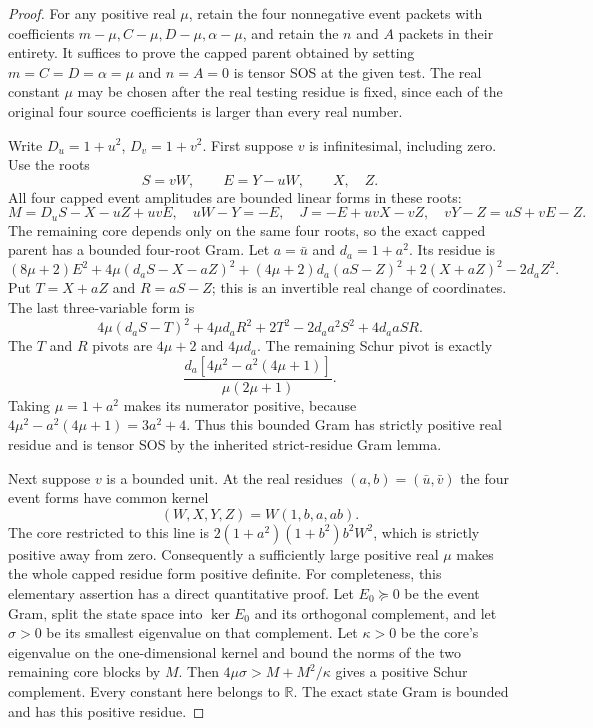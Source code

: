 \begin{proof}
For any positive real $\mu$, retain the four nonnegative event
packets with coefficients $m-\mu,C-\mu,D-\mu,\alpha-\mu$, and
retain the $n$ and $A$ packets in their entirety. It suffices to
prove the capped parent obtained by setting
$m=C=D=\alpha=\mu$ and $n=A=0$ is tensor SOS at the given test.
The real constant $\mu$ may be chosen after the real testing
residue is fixed, since each of the original four source
coefficients is larger than every real number.

Write $D_u=1+u^2$, $D_v=1+v^2$.
First suppose $v$ is infinitesimal, including zero. Use the roots
\[
 S=vW,\qquad E=Y-uW,\qquad X,\quad Z.
\]
All four capped event amplitudes are bounded linear forms in
these roots:
\[
 M=D_uS-X-uZ+uvE,\quad uW-Y=-E,\quad
 J=-E+uvX-vZ,\quad vY-Z=uS+vE-Z.
\]
The remaining core depends only on the same four roots, so the
exact capped parent has a bounded four-root Gram.
Let $a=\bar u$ and $d_a=1+a^2$. Its residue is
\[
 (8\mu+2)E^2+
 4\mu(d_aS-X-aZ)^2+(4\mu+2)d_a(aS-Z)^2
       +2(X+aZ)^2-2d_aZ^2.
\]
Put $T=X+aZ$ and $R=aS-Z$; this is an invertible real change of
coordinates. The last three-variable form is
\[
 4\mu(d_aS-T)^2+4\mu d_aR^2+2T^2
       -2d_a a^2S^2+4d_a aSR.
\]
The $T$ and $R$ pivots are $4\mu+2$ and $4\mu d_a$.
The remaining Schur pivot is exactly
\[
 \frac{d_a[4\mu^2-a^2(4\mu+1)]}{\mu(2\mu+1)}.
\]
Taking $\mu=1+a^2$ makes its numerator positive, because
$4\mu^2-a^2(4\mu+1)=3a^2+4$.
Thus this bounded Gram has strictly positive real residue and
is tensor SOS by the inherited strict-residue Gram lemma.

Next suppose $v$ is a bounded unit. At the real residues
$(a,b)=(\bar u,\bar v)$ the four event forms have common kernel
\[
 (W,X,Y,Z)=W(1,b,a,ab).
\]
The core restricted to this line is
$2(1+a^2)(1+b^2)b^2W^2$, which is strictly positive away from zero.
Consequently a sufficiently large positive real $\mu$ makes the
whole capped residue form positive definite. For completeness,
this elementary assertion has a direct quantitative proof.
Let $E_0\succeq0$ be the event Gram, split the state space into
$\ker E_0$ and its orthogonal complement, and let $\sigma>0$ be
its smallest eigenvalue on that complement. Let $\kappa>0$ be
the core's eigenvalue on the one-dimensional kernel and bound
the norms of the two remaining core blocks by $M$.
Then $4\mu\sigma>M+M^2/\kappa$ gives a positive Schur
complement. Every constant here belongs to $\mathbb R$.
The exact state Gram is bounded and has this positive residue.


\end{proof}
